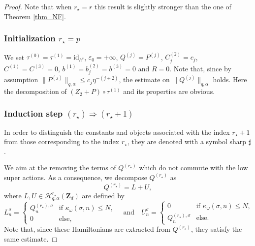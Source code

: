 \documentclass[JEP,XML,SOM,Unicode,NoEqCountersInSection,published]{cedram}
\theoremstyle{definition}
\begin{document}
\begin{proof}
Note that when $r_{\star}=r$ this result is slightly stronger than the one of Theorem \ref{thm_NF}.

\subsubsection*{Initialization $r_\star = p$}
We set $\tau^{(0)}=\tau^{(1)}=\mathrm{id}_{h^s}$, $\varepsilon_0= +\infty$, $Q^{(j)}=P^{(j)}$, $C_{j}^{(2)}=c_j$, $C^{(1)}=C^{(3)}=0$, $b^{(1)}=b_{j}^{(2)}=b^{(3)}=0$ and $R =0$. Note that, since by assumption $\| P^{(j)}\|_{q,\alpha} \leq c_j \eta^{-(j+2)}$, the estimate on $\| Q^{(j)}\|_{q,\alpha}$ holds. Here the decomposition of $(Z_2+P) \circ \tau^{(1)}$ and its properties are obvious.

\subsubsection*{Induction step $(r_\star) \Rightarrow (r_{\star}+1)$}
In order to distinguish the constants and objects associated with the index $r_{\star}+1$ from those corresponding to the index $r_{\star}$, they are denoted with a symbol sharp $\sharp$.

We aim at the removing the terms of $ Q^{(r_\star)}$ which do not commute with the low super actions. As a consequence, we decompose $Q^{(r_\star)}$ as
\[
Q^{(r_\star)} = L+U,
\]
where $L,U \in \mathscr{H}_{q,\alpha}^{r_\star}(\mathbf{Z}_d)$ are defined by
\[
L_n^\sigma = \begin{cases} Q^{(r_\star),\sigma}_n & \text{if } \kappa_\omega(\sigma,n) \leq N, \\
0 & \text{else},
\end{cases}
\quad\text{and} \quad U_n^\sigma = \begin{cases} 0 & \text{if } \kappa_\omega(\sigma,n) \leq N, \\
Q^{(r_\star),\sigma}_n & \text{else}.
\end{cases}
\]
Note that, since these Hamiltonians are extracted from $Q^{(r_\star)}$, they satisfy the same estimate.


\end{proof}
\end{document}
